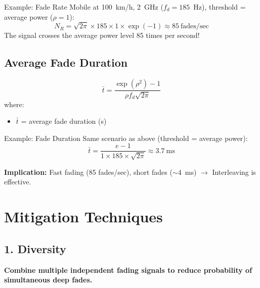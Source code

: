 \begin{calloutbox}{Example: Fade Rate}
Mobile at 100~km/h, 2~GHz ($f_d = 185$~Hz), threshold = average power ($\rho = 1$):
\begin{equation*}
N_R = \sqrt{2\pi} \times 185 \times 1 \times \exp(-1) \approx 85~\text{fades/sec}
\end{equation*}
The signal crosses the average power level 85 times per second!
\end{calloutbox}

\subsection{Average Fade Duration}

\begin{equation}
\bar{t} = \frac{\exp(\rho^2) - 1}{\rho f_d \sqrt{2\pi}}
\label{eq:average-fade-duration}
\end{equation}
where:
\begin{itemize}
\item $\bar{t}$ = average fade duration (s)
\end{itemize}

\begin{calloutbox}{Example: Fade Duration}
Same scenario as above (threshold = average power):
\begin{equation*}
\bar{t} = \frac{e - 1}{1 \times 185 \times \sqrt{2\pi}} \approx 3.7~\text{ms}
\end{equation*}

\textbf{Implication:} Fast fading (85 fades/sec), short fades ($\sim$4~ms) $\rightarrow$ Interleaving is effective.
\end{calloutbox}

\section{Mitigation Techniques}

\subsection{1. Diversity}

\textbf{Combine multiple independent fading signals to reduce probability of simultaneous deep fades.}

